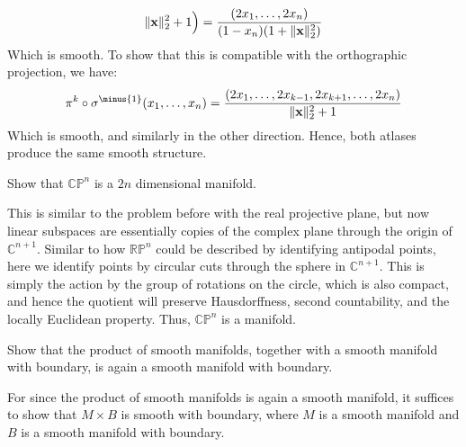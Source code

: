 \documentclass{article}                                                        %
\begin{document}
\begin{solution}
\begin{equation}
                        {\lVert\boldsymbol{\mathrm{x}}\rVert_{2}^{2}+1}
                \Big)
                =\frac{(2x_{1},\dots,2x_{n})}
                    {(1-x_{n})(1+\lVert\boldsymbol{\mathrm{x}}\rVert_{2}^{2})}
            \end{equation}
            Which is smooth. To show that this is compatible with the orthographic
            projection, we have:
            \begin{equation}
                \pi^{k}\circ\sigma^{\minus{1}}(x_{1},\dots,x_{n})
                =\frac{(2x_{1},\dots,2x_{k-1},2x_{k+1},\dots,2x_{n})}
                    {\norm{\vector{x}}_{2}^{2}+1}
            \end{equation}
            Which is smooth, and similarly in the other direction. Hence, both
            atlases produce the same smooth structure.
        \end{solution}
        \begin{problem}
            Show that $\mathbb{CP}^{n}$ is a $2n$ dimensional manifold.
        \end{problem}
        \begin{solution}
            This is similar to the problem before with the real projective plane,
            but now linear subspaces are essentially copies of the complex plane
            through the origin of $\mathbb{C}^{n+1}$. Similar to how
            $\mathbb{RP}^{n}$ could be described by identifying antipodal points,
            here we identify points by circular cuts through the sphere in
            $\mathbb{C}^{n+1}$. This is simply the action by the group of rotations
            on the circle, which is also compact, and hence the quotient will
            preserve Hausdorffness, second countability, and the locally Euclidean
            property. Thus, $\mathbb{CP}^{n}$ is a manifold.
        \end{solution}
        \begin{problem}
            Show that the product of smooth manifolds, together with a smooth
            manifold with boundary, is again a smooth manifold with boundary.
        \end{problem}
        \begin{solution}
            For since the product of smooth manifolds is again a smooth manifold,
            it suffices to show that $M\times{B}$ is smooth with boundary, where
            $M$ is a smooth manifold and $B$ is a smooth manifold with boundary.
        \end{solution}
\end{document}
